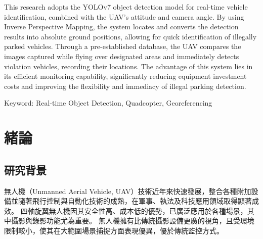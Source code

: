 \documentclass[12pt]{article}       %
\begin{document}
This research adopts the YOLOv7 object detection model for real-time vehicle identification, combined with the UAV's attitude and camera angle.
By using Inverse Perspective Mapping, the system locates and converts the detection results into absolute ground positions, allowing for quick identification of illegally parked vehicles.
Through a pre-established database, the UAV compares the images captured while flying over designated areas and immediately detects violation vehicles, recording their locations. The advantage of this system lies in its efficient monitoring capability, significantly reducing equipment investment costs and improving the flexibility and immediacy of illegal parking detection.

\vspace{1.5em}
\noindent Keyword: Real-time Object Detection, Quadcopter, Georeferencing
\newpage  %


\begin{center}
    \tableofcontents    %
    \newpage  %
    \listoffigures      %
    \newpage  %
    \listoftables       %
\end{center}
    
    \newpage  %

\setcounter{page}{1}  %


\section{\centering 緒論}

\subsection{研究背景} 
\hspace{2em}
無人機（Unmanned Aerial Vehicle, UAV）技術近年來快速發展，整合各種附加設備並隨著飛行控制與自動化技術的成熟，在軍事、執法及科技應用領域取得顯著成效。
四軸旋翼無人機因其安全性高、成本低的優勢，已廣泛應用於各種場景，其中攝影與錄影功能尤為重要。
無人機擁有比傳統攝影設備更廣的視角，且受環境限制較小，使其在大範圍場景捕捉方面表現優異，優於傳統監控方式。
\end{document}
